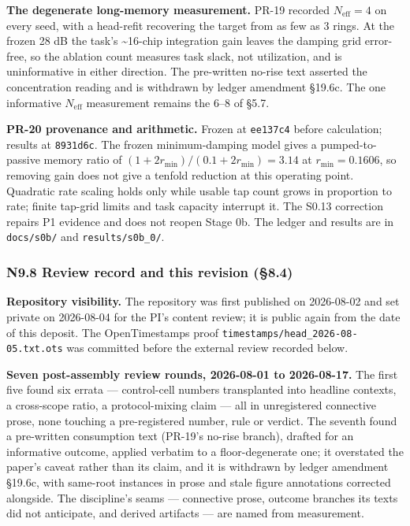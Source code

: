 \documentclass[
  10pt,
]{article}
\newcounter{none} %
\begin{document}
\textbf{The degenerate long-memory measurement.} PR-19 recorded
\(N_\text{eff} = 4\) on every seed, with a head-refit recovering the
target from as few as 3 rings. At the frozen 28 dB the task's
\textasciitilde16-chip integration gain leaves the damping grid
error-free, so the ablation count measures task slack, not utilization,
and is uninformative in either direction. The pre-written no-rise text
asserted the concentration reading and is withdrawn by ledger amendment
§19.6c. The one informative \(N_\text{eff}\) measurement remains the
6--8 of §5.7.

\textbf{PR-20 provenance and arithmetic.} Frozen at \texttt{ee137c4}
before calculation; results at \texttt{8931d6c}. The frozen
minimum-damping model gives a pumped-to-passive memory ratio of
\((1+2r_{\min})/(0.1+2r_{\min})=3.14\) at \(r_{\min}=0.1606\), so
removing gain does not give a tenfold reduction at this operating point.
Quadratic rate scaling holds only while usable tap count grows in
proportion to rate; finite tap-grid limits and task capacity interrupt
it. The S0.13 correction repairs P1 evidence and does not reopen Stage
0b. The ledger and results are in \texttt{docs/s0b/} and
\texttt{results/s0b\_0/}.

\subsubsection{N9.8 Review record and this revision
(§8.4)}\label{n9.8-review-record-and-this-revision-8.4}

\textbf{Repository visibility.} The repository was first published on
2026-08-02 and set private on 2026-08-04 for the PI's content review; it
is public again from the date of this deposit. The OpenTimestamps proof
\texttt{timestamps/head\_2026-08-05.txt.ots} was committed before the
external review recorded below.

\textbf{Seven post-assembly review rounds, 2026-08-01 to 2026-08-17.}
The first five found six errata --- control-cell numbers transplanted
into headline contexts, a cross-scope ratio, a protocol-mixing claim ---
all in unregistered connective prose, none touching a pre-registered
number, rule or verdict. The seventh found a pre-written consumption
text (PR-19's no-rise branch), drafted for an informative outcome,
applied verbatim to a floor-degenerate one; it overstated the paper's
caveat rather than its claim, and it is withdrawn by ledger amendment
§19.6c, with same-root instances in prose and stale figure annotations
corrected alongside. The discipline's seams --- connective prose,
outcome branches its texts did not anticipate, and derived artifacts ---
are named from measurement.
\end{document}
